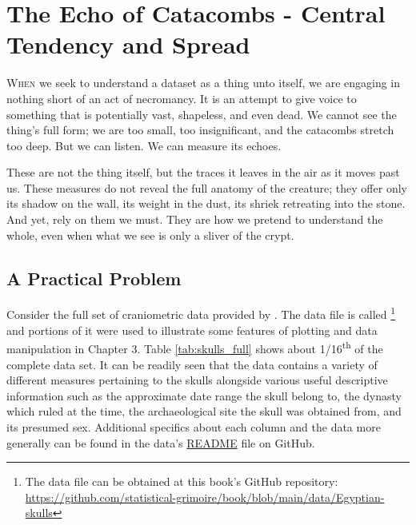 \chapter{The Echo of Catacombs - Central Tendency and Spread}

\IMFellEnglish
\lettrine[lines=5, realheight]{W}{hen} we seek to understand a dataset as a thing unto itself, we are engaging in nothing short of an act of necromancy. It is an attempt to give voice to something that is potentially vast, shapeless, and even dead. We cannot see the thing's full form; we are too small, too insignificant, and the catacombs stretch too deep. But we can listen. We can measure its echoes. 

These are not the thing itself, but the traces it leaves in the air as it moves past us. These measures do not reveal the full anatomy of the creature; they offer only its shadow on the wall, its weight in the dust, its shriek retreating into the stone. And yet, rely on them we must. They are how we pretend to understand the whole, even when what we see is only a sliver of the crypt.

\normalfont

\section{A Practical Problem}

Consider the full set of craniometric data provided by \textcite{Thomson1905}. The data file is called \footnote{The data file can be obtained at this book's GitHub repository: \url{https://github.com/statistical-grimoire/book/blob/main/data/Egyptian-skulls}} and portions of it were used to illustrate some features of plotting and data manipulation in Chapter 3. Table \ref{tab:skulls_full} shows about 1/16\textsuperscript{th} of the complete data set. It can be readily seen that the data contains a variety of different measures pertaining to the skulls alongside various useful descriptive information such as the approximate date range the skull belong to, the dynasty which ruled at the time, the archaeological site the skull was obtained from, and its presumed sex. Additional specifics about each column and the data more generally can be found in the data's \href{https://github.com/statistical-grimoire/book/blob/main/data/Egyptian-skulls}{README} file on GitHub.

